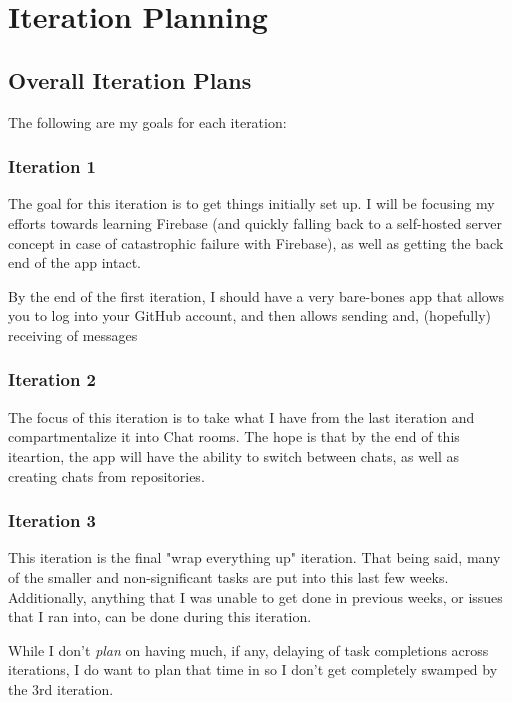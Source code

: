 \documentclass{report}
\begin{document}
\chapter{Iteration Planning}

\section{Overall Iteration Plans}

The following are my goals for each iteration:

\subsection{Iteration 1}

The goal for this iteration is to get things initially set up. I will be focusing my efforts towards learning Firebase (and quickly falling back to a self-hosted server concept in case of catastrophic failure with Firebase), as well as getting the back end of the app intact.

By the end of the first iteration, I should have a very bare-bones app that allows you to log into your GitHub account, and then allows sending and, (hopefully) receiving  of messages

\subsection{Iteration 2}

The focus of this iteration is to take what I have from the last iteration and compartmentalize it into Chat rooms. The hope is that by the end of this iteartion, the app will have the ability to switch between chats, as well as creating chats from repositories.

\subsection{Iteration 3}

This iteration is the final "wrap everything up" iteration. That being said, many of the smaller and non-significant tasks are put into this last few weeks. Additionally, anything that I was unable to get done in previous weeks, or issues that I ran into, can be done during this iteration.

While I don't \textit{plan} on having much, if any, delaying of task completions across iterations, I do want to plan that time in so I don't get completely swamped by the 3rd iteration.
\end{document}
